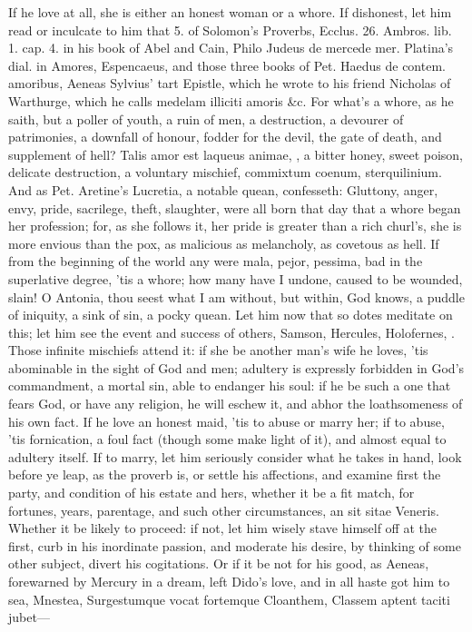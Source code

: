 {If he love at all, she is either an honest woman or a whore. If
dishonest, let him read or inculcate to him that 5. of Solomon's
Proverbs, Ecclus. 26. Ambros. lib. 1. cap. 4. in his book of Abel and
Cain, Philo Judeus de mercede mer. Platina's dial. in Amores,
Espencaeus, and those three books of Pet. Haedus de contem. amoribus,
Aeneas Sylvius' tart Epistle, which he wrote to his friend Nicholas of
Warthurge, which he calls medelam illiciti amoris \&c. For what's
a whore, as he saith, but a poller of youth, a ruin of men, a
destruction, a devourer of patrimonies, a downfall of honour, fodder
for the devil, the gate of death, and supplement of hell? Talis
amor est laqueus animae, \etc{}, a bitter honey, sweet poison, delicate
destruction, a voluntary mischief, commixtum coenum, sterquilinium. And
as Pet. Aretine's Lucretia, a notable quean, confesseth:
Gluttony, anger, envy, pride, sacrilege, theft, slaughter, were all
born that day that a whore began her profession; for, as she follows
it, her pride is greater than a rich churl's, she is more envious than
the pox, as malicious as melancholy, as covetous as hell. If from the
beginning of the world any were mala, pejor, pessima, bad in the
superlative degree, 'tis a whore; how many have I undone, caused to be
wounded, slain! O Antonia, thou seest what I am without, but
within, God knows, a puddle of iniquity, a sink of sin, a pocky quean.
Let him now that so dotes meditate on this; let him see the event and
success of others, Samson, Hercules, Holofernes, \etc{}. Those infinite
mischiefs attend it: if she be another man's wife he loves, 'tis
abominable in the sight of God and men; adultery is expressly forbidden
in God's commandment, a mortal sin, able to endanger his soul: if he be
such a one that fears God, or have any religion, he will eschew it, and
abhor the loathsomeness of his own fact. If he love an honest maid,
'tis to abuse or marry her; if to abuse, 'tis fornication, a foul fact
(though some make light of it), and almost equal to adultery itself. If
to marry, let him seriously consider what he takes in hand, look before
ye leap, as the proverb is, or settle his affections, and examine first
the party, and condition of his estate and hers, whether it be a fit
match, for fortunes, years, parentage, and such other circumstances, an
sit sitae Veneris. Whether it be likely to proceed: if not, let him
wisely stave himself off at the first, curb in his inordinate passion,
and moderate his desire, by thinking of some other subject, divert his
cogitations. Or if it be not for his good, as Aeneas, forewarned by
Mercury in a dream, left Dido's love, and in all haste got him to sea,
Mnestea, Surgestumque vocat fortemque Cloanthem,
Classem aptent taciti jubet---

}
